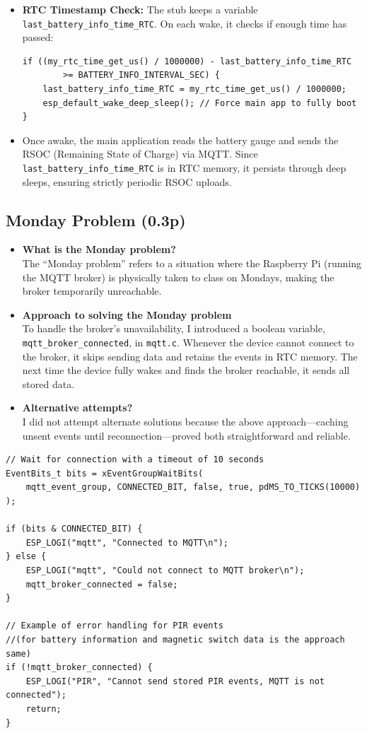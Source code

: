 \documentclass[A4,10pt]{article}
\begin{document}
\begin{itemize}
    \item \textbf{RTC Timestamp Check:} The stub keeps a variable \texttt{last\_battery\_info\_time\_RTC}. On each wake, it checks if enough time has passed:
\begin{verbatim}
if ((my_rtc_time_get_us() / 1000000) - last_battery_info_time_RTC 
        >= BATTERY_INFO_INTERVAL_SEC) {
    last_battery_info_time_RTC = my_rtc_time_get_us() / 1000000;
    esp_default_wake_deep_sleep(); // Force main app to fully boot
}
\end{verbatim}
    \item Once awake, the main application reads the battery gauge and sends the RSOC (Remaining State of Charge) via MQTT. Since \texttt{last\_battery\_info\_time\_RTC} is in RTC memory, it persists through deep sleeps, ensuring strictly periodic RSOC uploads.
\end{itemize}


\subsection{Monday Problem (0.3p)}

\begin{itemize}[noitemsep]
    \item \textbf{What is the Monday problem?}\\
    The “Monday problem” refers to a situation where the Raspberry Pi (running the MQTT broker) is physically taken to class on Mondays, making the broker temporarily unreachable.

    \item \textbf{Approach to solving the Monday problem}\\
    To handle the broker’s unavailability, I introduced a boolean variable, \texttt{mqtt\_broker\_connected}, in \texttt{mqtt.c}. Whenever the device cannot connect to the broker, it skips sending data and retains the events in RTC memory. The next time the device fully wakes and finds the broker reachable, it sends all stored data.

    \item \textbf{Alternative attempts?}\\
    I did not attempt alternate solutions because the above approach—caching unsent events until reconnection—proved both straightforward and reliable.
\end{itemize}

\begin{verbatim}
// Wait for connection with a timeout of 10 seconds
EventBits_t bits = xEventGroupWaitBits(
    mqtt_event_group, CONNECTED_BIT, false, true, pdMS_TO_TICKS(10000)
);

if (bits & CONNECTED_BIT) {
    ESP_LOGI("mqtt", "Connected to MQTT\n");
} else {
    ESP_LOGI("mqtt", "Could not connect to MQTT broker\n");
    mqtt_broker_connected = false;
}

// Example of error handling for PIR events 
//(for battery information and magnetic switch data is the approach same)
if (!mqtt_broker_connected) {
    ESP_LOGI("PIR", "Cannot send stored PIR events, MQTT is not connected");
    return;
}
\end{verbatim}
\end{document}
